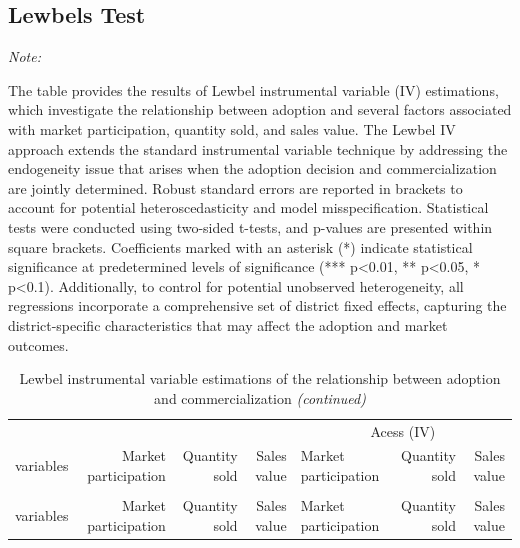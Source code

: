 \documentclass[
]{article}
\begin{document}
\hypertarget{lewbels-test}{%
\subsection{Lewbels Test}\label{lewbels-test}}

\begingroup\fontsize{7}{9}\selectfont

\begin{ThreePartTable}
\begin{TableNotes}[para]
\item \textit{Note: } 
\item The table provides the results of Lewbel instrumental variable (IV) estimations, which investigate the relationship between adoption and several factors associated with market participation, quantity sold, and sales value. The Lewbel IV approach extends the standard instrumental variable technique by addressing the endogeneity issue that arises when the adoption decision and commercialization are jointly determined. Robust standard errors are reported in brackets to account for potential heteroscedasticity and model misspecification. Statistical tests were conducted using two-sided t-tests, and p-values are presented within square brackets. Coefficients marked with an asterisk (*) indicate statistical significance at predetermined levels of significance (*** p<0.01, ** p<0.05, * p<0.1). Additionally, to control for potential unobserved heterogeneity, all regressions incorporate a comprehensive set of district fixed effects, capturing the district-specific characteristics that may affect the adoption and market outcomes.
\end{TableNotes}
\begin{longtable}[t]{lrrrlrr}
\caption{\label{tab:unnamed-chunk-15}Lewbel instrumental variable estimations of the relationship between adoption and commercialization}\\
\toprule
\multicolumn{1}{c}{ } & \multicolumn{1}{c}{ } & \multicolumn{1}{c}{ } & \multicolumn{1}{c}{ } & \multicolumn{3}{c}{Acess (IV)} \\
\cmidrule(l{3pt}r{3pt}){5-7}
variables & Market participation & Quantity sold & Sales value & Market participation & Quantity sold & Sales value\\
\midrule
\endfirsthead
\caption[]{\label{tab:unnamed-chunk-15}Lewbel instrumental variable estimations of the relationship between adoption and commercialization \textit{(continued)}}\\
\toprule
variables & Market participation & Quantity sold & Sales value & Market participation & Quantity sold & Sales value\\
\midrule
\endhead


\end{longtable}
\end{ThreePartTable}
\end{document}
